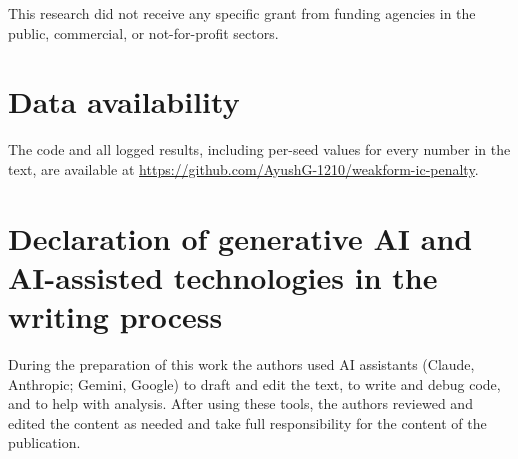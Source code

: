 \documentclass[a4paper,fleqn]{cas-sc}
\begin{document}
This research did not receive any specific grant from funding agencies in the public, commercial, or not-for-profit
sectors.

\section*{Data availability}
The code and all logged results, including per-seed values for every number in the text, are available at
\url{https://github.com/AyushG-1210/weakform-ic-penalty}.

\section*{Declaration of generative AI and AI-assisted technologies in the writing process}
During the preparation of this work the authors used AI assistants (Claude, Anthropic; Gemini, Google) to draft and edit
the text, to write and debug code, and to help with analysis. After using these tools, the authors reviewed and edited
the content as needed and take full responsibility for the content of the publication.
\end{document}
